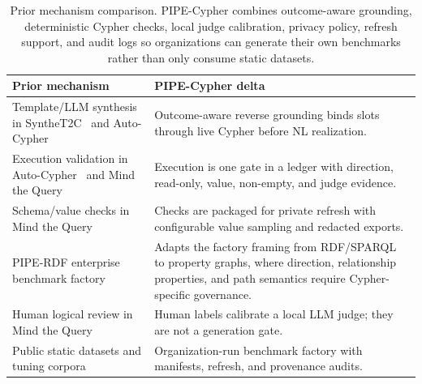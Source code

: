 \begin{table}[H]
\centering
\footnotesize
\begin{tabular}{@{}p{}p{}@{}}
\toprule
Prior mechanism & PIPE-Cypher delta \\
\midrule
Template/LLM synthesis in SyntheT2C~\citep{synthet2c2025} and Auto-Cypher~\citep{autocypher2025} & Outcome-aware reverse grounding binds slots through live Cypher before NL realization. \\
Execution validation in Auto-Cypher~\citep{autocypher2025} and Mind the Query~\citep{mindthequery2025} & Execution is one gate in a ledger with direction, read-only, value, non-empty, and judge evidence. \\
Schema/value checks in Mind the Query~\citep{mindthequery2025} & Checks are packaged for private refresh with configurable value sampling and redacted exports. \\
PIPE-RDF enterprise benchmark factory~\citep{ranganath2026piperd} & Adapts the factory framing from RDF/SPARQL to property graphs, where direction, relationship properties, and path semantics require Cypher-specific governance. \\
Human logical review in Mind the Query~\citep{mindthequery2025} & Human labels calibrate a local LLM judge; they are not a generation gate. \\
Public static datasets and tuning corpora~\citep{text2cypher2025,cypherbench2025,text2cypher2024dataset} & Organization-run benchmark factory with manifests, refresh, and provenance audits. \\
\bottomrule
\end{tabular}
\caption{Prior mechanism comparison. PIPE-Cypher combines outcome-aware grounding, deterministic Cypher checks, local judge calibration, privacy policy, refresh support, and audit logs so organizations can generate their own benchmarks rather than only consume static datasets.}
\label{tab:prior_mechanism_comparison}
\end{table}
